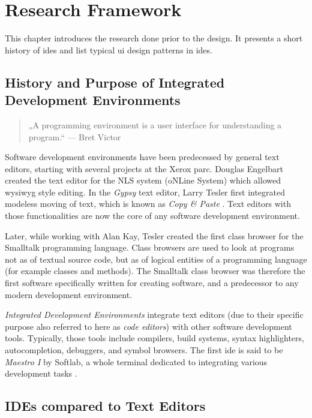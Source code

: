 \chapter{Research Framework}\label{research}

This chapter introduces the research done prior to the design. It
presents a short history of \glspl{ide} and list typical \gls{ui} design
patterns in \glspl{ide}.

\section{History and Purpose of Integrated Development
Environments}\label{history-and-purpose-of-integrated-development-environments}

\begin{quote}
„A programming environment is a user interface for understanding a
program.“ — Bret Victor \citeyear{victor}
\end{quote}

Software development environments have been predecessed by general text
editors, starting with several projects at the Xerox \gls{parc}. Douglas
Engelbart created the text editor for the NLS system (oNLine System)
which allowed \gls{wysiwyg} style editing. In the \emph{Gypsy} text
editor, Larry Tesler first integrated modeless moving of text, which is
known as \emph{Copy \& Paste} \cite{moggridge}. Text editors with those
functionalities are now the core of any software development
environment.

Later, while working with Alan Kay, Tesler created the first class
browser for the Smalltalk programming language. Class browsers are used
to look at programs not as of textual source code, but as of logical
entities of a programming language (for example classes and methods).
The Smalltalk class browser was therefore the first software
specifically written for creating software, and a predecessor to any
modern development environment.

\emph{Integrated Development Environments} integrate text editors (due
to their specific purpose also referred to here as \emph{code editors})
with other software development tools. Typically, those tools include
compilers, build systems, syntax highlighters, autocompletion,
debuggers, and symbol browsers. The first \ac{ide} is said to be
\emph{Maestro I} by Softlab, a whole terminal dedicated to integrating
various development tasks \cite{maestro}.

\section{IDEs compared to Text
Editors}\label{ides-compared-to-text-editors}

